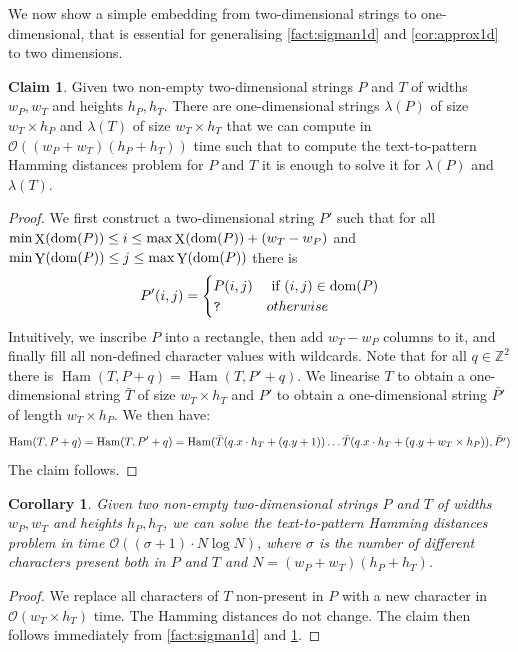 \documentclass[11pt, letterpaper]{article}
\theoremstyle{plain}
\newtheorem{corollary}[fact]{Corollary}
\theoremstyle{definition}
\newtheorem{claim}{Claim}
\theoremstyle{remark}
\newcommand{\Z}{\mathbb{Z}}
\renewcommand{\O}{\mathcal{O}}
\DeclareMathOperator*{\X}{X}
\DeclareMathOperator*{\Y}{Y}
\DeclareMathOperator*{\Ham}{Ham}
\begin{document}
We now show a simple embedding from two-dimensional strings to one-dimensional, that is essential for generalising \cref{fact:sigman1d} and \cref{cor:approx1d} to two dimensions.

\begin{claim}
\label{claim:padding}
Given two non-empty two-dimensional strings $P$ and $T$ of widths $w_P, w_T$ and heights $h_P, h_T$. There are one-dimensional strings $\lambda(P)$ of size $w_T \times h_P$ and $\lambda(T)$ of size $w_T \times h_T$ that we can compute in $\O((w_P+w_T)(h_P+h_T))$ time such that to compute the text-to-pattern Hamming distances problem for $P$ and $T$ it is enough to solve it for $\lambda(P)$ and $\lambda(T)$. 
\end{claim}
\begin{proof}
We first construct a two-dimensional string $P'$ such that for all $\min \X(\d{P}) \le i \le \max \X(\d{P})+(w_T-w_P)$ and $\min \Y(\d{P}) \le j \le \max \Y(\d{P})$ there is
%
$$
P'(i,j) = 
\begin{cases}
P(i,j) & \text{ if } (i,j) \in \operatorname*{dom}(P)\\
\texttt{?} & { otherwise}
\end{cases}
$$
%
Intuitively, we inscribe $P$ into a rectangle, then add $w_T-w_P$ columns to it, and finally fill all non-defined character values with wildcards. Note that for all $q \in \Z^2$ there is $\Ham(T,P+q) = \Ham(T,P'+q)$. We linearise $T$ to obtain a one-dimensional string $\bar{T}$ of size $w_T \times h_T$ and $P'$ to obtain a one-dimensional string $\bar{P'}$ of length $w_T \times h_P$. We then have:
%
$$\Ham(T, P+q) = \Ham(T,P'+q) = \Ham(\bar{T}(\x{q} \cdot h_T + (\y{q}+1)) \ldots \bar{T}(\x{q} \cdot h_T + (\y{q}+w_T \times h_P)), \bar{P'})$$
%
The claim follows. 
\end{proof}

\begin{corollary}\label{cor:sigman2d}
Given two non-empty two-dimensional strings $P$ and $T$ of widths $w_P, w_T$ and heights $h_P, h_T$, we can solve the text-to-pattern Hamming distances problem in time $\O((\sigma+1) \cdot N \log N)$, where $\sigma$ is the number of different characters present both in $P$ and $T$ and $N = (w_P + w_T)(h_P + h_T)$.
\end{corollary}
\begin{proof}
We replace all characters of $T$ non-present in $P$ with a new character in $\O(w_T\times h_T)$ time. The Hamming distances do not change. The claim then follows immediately from \cref{fact:sigman1d} and \cref{claim:padding}. 
\end{proof}
\end{document}
